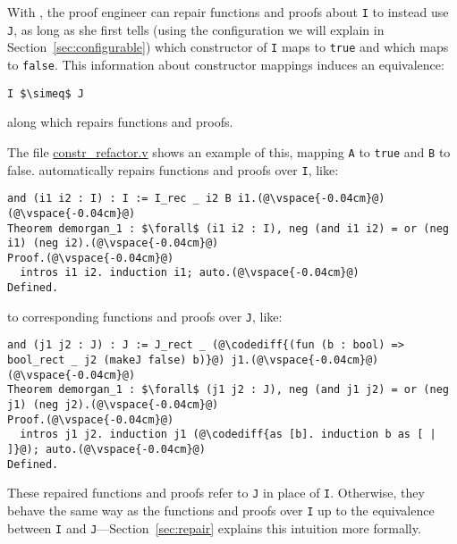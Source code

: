 With \toolname, the proof engineer can repair functions and proofs about \lstinline{I} to instead use \lstinline{J},
as long as she first tells \toolname (using the configuration we will explain in Section~\ref{sec:configurable}) which constructor of \lstinline{I} maps to \lstinline{true} and which maps to \lstinline{false}.
This information about constructor mappings induces an equivalence:

\begin{lstlisting}
I $\simeq$ J
\end{lstlisting}
along which \toolname repairs functions and proofs.

The file \href{https://github.com/uwplse/pumpkin-pi/blob/master/plugin/coq/playground/constr_refactor.v}{constr_refactor.v} shows an example
of this, mapping \lstinline{A} to \lstinline{true} and \lstinline{B} to false.
\toolname automatically repairs functions and proofs over \lstinline{I}, like:

\begin{lstlisting}
and (i1 i2 : I) : I := I_rec _ i2 B i1.(@\vspace{-0.04cm}@)
(@\vspace{-0.04cm}@)
Theorem demorgan_1 : $\forall$ (i1 i2 : I), neg (and i1 i2) = or (neg i1) (neg i2).(@\vspace{-0.04cm}@)
Proof.(@\vspace{-0.04cm}@)
  intros i1 i2. induction i1; auto.(@\vspace{-0.04cm}@)
Defined.
\end{lstlisting}
to corresponding functions and proofs over \lstinline{J}, like:

\begin{lstlisting}[backgroundcolor=\color{cyan!30}]
and (j1 j2 : J) : J := J_rect _ (@\codediff{(fun (b : bool) => bool_rect _ j2 (makeJ false) b)}@) j1.(@\vspace{-0.04cm}@)
(@\vspace{-0.04cm}@)
Theorem demorgan_1 : $\forall$ (j1 j2 : J), neg (and j1 j2) = or (neg j1) (neg j2).(@\vspace{-0.04cm}@)
Proof.(@\vspace{-0.04cm}@)
  intros j1 j2. induction j1 (@\codediff{as [b]. induction b as [ | ]}@); auto.(@\vspace{-0.04cm}@)
Defined.
\end{lstlisting}
These repaired functions and proofs refer to \lstinline{J} in place of \lstinline{I}.
Otherwise, they behave the same way as the functions and proofs over \lstinline{I} up to the equivalence between
\lstinline{I} and \lstinline{J}---Section~\ref{sec:repair} explains this intuition more formally.

